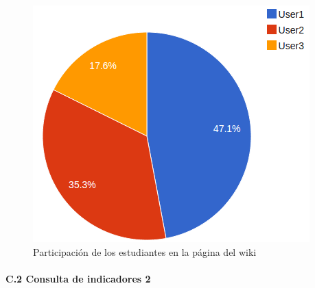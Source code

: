 \begin{figure}[h]
 \begin{center}
    \includegraphics[scale=0.65]{santa_pie.png}
  \end{center}
  \caption{Participación de los estudiantes en la página del wiki}
  \label{fig:SantaPie}
\end{figure}

\newpage






	\paragraph*{C.2 Consulta de indicadores 2}

